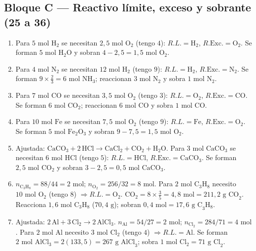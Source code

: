 \documentclass[12pt, letterpaper]{article}
\begin{document}
\subsection*{Bloque C — Reactivo límite, exceso y sobrante (25 a 36)}

\begin{enumerate}[leftmargin=*, label=\textbf{\arabic*.}, start=25]
  \item Para $5\text{ mol H}_2$ se necesitan $2{,}5\text{ mol O}_2$ (tengo $4$): $R.L. = \text{H}_2$, $R.\text{Exc.} = \text{O}_2$. Se forman $5\text{ mol H}_2\text{O}$ y sobran $4 - 2{,}5 = 1{,}5\text{ mol O}_2$.
  \item Para $4\text{ mol N}_2$ se necesitan $12\text{ mol H}_2$ (tengo $9$): $R.L. = \text{H}_2$, $R.\text{Exc.} = \text{N}_2$. Se forman $9\times\frac{2}{3} = 6\text{ mol NH}_3$; reaccionan $3\text{ mol N}_2$ y sobra $1\text{ mol N}_2$.
  \item Para $7\text{ mol CO}$ se necesitan $3{,}5\text{ mol O}_2$ (tengo $3$): $R.L. = \text{O}_2$, $R.\text{Exc.} = \text{CO}$. Se forman $6\text{ mol CO}_2$; reaccionan $6\text{ mol CO}$ y sobra $1\text{ mol CO}$.
  \item Para $10\text{ mol Fe}$ se necesitan $7{,}5\text{ mol O}_2$ (tengo $9$): $R.L. = \text{Fe}$, $R.\text{Exc.} = \text{O}_2$. Se forman $5\text{ mol Fe}_2\text{O}_3$ y sobran $9 - 7{,}5 = 1{,}5\text{ mol O}_2$.
  \item Ajustada: $\text{CaCO}_3 + 2\,\text{HCl} \longrightarrow \text{CaCl}_2 + \text{CO}_2 + \text{H}_2\text{O}$. Para $3\text{ mol CaCO}_3$ se necesitan $6\text{ mol HCl}$ (tengo $5$): $R.L. = \text{HCl}$, $R.\text{Exc.} = \text{CaCO}_3$. Se forman $2{,}5\text{ mol CO}_2$ y sobran $3 - 2{,}5 = 0{,}5\text{ mol CaCO}_3$.
  \item $n_{\text{C}_3\text{H}_8} = 88/44 = 2\text{ mol}$; $n_{\text{O}_2} = 256/32 = 8\text{ mol}$. Para $2\text{ mol C}_3\text{H}_8$ necesito $10\text{ mol O}_2$ (tengo $8$) $\Rightarrow R.L. = \text{O}_2$. $\text{CO}_2 = 8\times\frac{3}{5} = 4{,}8\text{ mol} = 211{,}2\text{ g CO}_2$. Reacciona $1{,}6\text{ mol C}_3\text{H}_8$ ($70{,}4\text{ g}$); sobran $0{,}4\text{ mol} = 17{,}6\text{ g C}_3\text{H}_8$.
  \item Ajustada: $2\,\text{Al} + 3\,\text{Cl}_2 \longrightarrow 2\,\text{AlCl}_3$. $n_{\text{Al}} = 54/27 = 2\text{ mol}$; $n_{\text{Cl}_2} = 284/71 = 4\text{ mol}$. Para $2\text{ mol Al}$ necesito $3\text{ mol Cl}_2$ (tengo $4$) $\Rightarrow R.L. = \text{Al}$. Se forman $2\text{ mol AlCl}_3 = 2(133{,}5) = 267\text{ g AlCl}_3$; sobra $1\text{ mol Cl}_2 = 71\text{ g Cl}_2$.

\end{enumerate}
\end{document}
